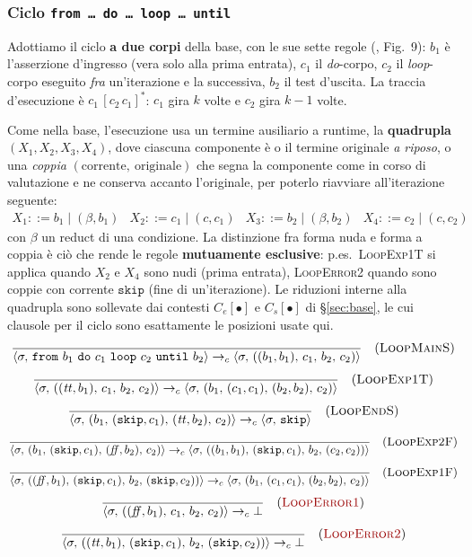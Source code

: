 \subsubsection{Ciclo \texttt{from\,\dots\,do\,\dots\,loop\,\dots\,until}}
\label{sec:loop}
Adottiamo il ciclo \textbf{a due corpi} della base, con le sue sette regole
(\cite{LamiLaneseStefani2024}, Fig.~9): $b_1$ è l'asserzione d'ingresso (vera
solo alla prima entrata), $c_1$ il \emph{do}-corpo, $c_2$ il \emph{loop}-corpo
eseguito \emph{fra} un'iterazione e la successiva, $b_2$ il test d'uscita. La
traccia d'esecuzione è $c_1\,[c_2\,c_1]^{*}$: $c_1$ gira $k$ volte e $c_2$
gira $k-1$ volte.

\medskip
\noindent
Come nella base, l'esecuzione usa un termine ausiliario a runtime, la
\textbf{quadrupla} $(X_1, X_2, X_3, X_4)$, dove ciascuna componente è o il
termine originale \emph{a riposo}, o una \emph{coppia}
$(\text{corrente},\allowbreak\ \text{originale})$ che segna la componente come in corso di valutazione e ne
conserva accanto l'originale, per poterlo riavviare all'iterazione seguente:
\[
\begin{array}{llll}
X_1 ::= b_1 \mid (\beta, b_1) &
X_2 ::= c_1 \mid (c, c_1) &
X_3 ::= b_2 \mid (\beta, b_2) &
X_4 ::= c_2 \mid (c, c_2)
\end{array}
\]
con $\beta$ un reduct di una condizione. La distinzione fra forma nuda e forma
a coppia è ciò che rende le regole \textbf{mutuamente esclusive}: p.es.\
\textsc{LoopExp1T} si applica quando $X_2$ e $X_4$ sono nudi (prima entrata),
\textcolor{red!60!black}{\textsc{LoopError2}} quando sono coppie con corrente
$\mathtt{skip}$ (fine di un'iterazione). Le riduzioni interne alla quadrupla
sono sollevate dai contesti $C_e[\bullet]$ e $C_s[\bullet]$ di
\S\ref{sec:base}, le cui clausole per il ciclo sono esattamente le posizioni
usate qui.
\[
\dfrac{}{\cfg{\mathtt{from}\ b_1\ \mathtt{do}\ c_1\ \mathtt{loop}\ c_2\ \mathtt{until}\ b_2}{\sigma}
       \toc \cfg{((b_1,b_1),\, c_1,\, b_2,\, c_2)}{\sigma}} \rname{LoopMainS}
\]
\[
\dfrac{}{\langle \sigma,\, ((\mathit{tt},b_1),\, c_1,\, b_2,\, c_2) \rangle
       \to_c \langle \sigma,\, (b_1,\, (c_1,c_1),\, (b_2,b_2),\, c_2) \rangle} \quad(\textsc{LoopExp1T})
\]
\[
\dfrac{}{\langle \sigma,\, (b_1,\, (\mathtt{skip},c_1),\, (\mathit{tt},b_2),\, c_2) \rangle
       \to_c \langle \sigma,\, \mathtt{skip} \rangle} \quad(\textsc{LoopEndS})
\]
{\small
\[
\dfrac{}{\langle \sigma,\, (b_1,\, (\mathtt{skip},c_1),\, (\mathit{ff},b_2),\, c_2) \rangle
       \to_c \langle \sigma,\, ((b_1,b_1),\, (\mathtt{skip},c_1),\, b_2,\, (c_2,c_2)) \rangle} \quad(\textsc{LoopExp2F})
\]}
{\small
\[
\dfrac{}{\langle \sigma,\, ((\mathit{ff},b_1),\, (\mathtt{skip},c_1),\, b_2,\, (\mathtt{skip},c_2)) \rangle
       \to_c \langle \sigma,\, (b_1,\, (c_1,c_1),\, (b_2,b_2),\, c_2) \rangle} \quad(\textsc{LoopExp1F})
\]}
\[
\dfrac{}{\cfg{((\ff,b_1),\, c_1,\, b_2,\, c_2)}{\sigma} \toc \bot} \rnameerr{LoopError1}
\]
\[
\dfrac{}{\cfg{((\ttt,b_1),\, (\mathtt{skip},c_1),\, b_2,\, (\mathtt{skip},c_2))}{\sigma}
       \toc \bot} \rnameerr{LoopError2}
\]

